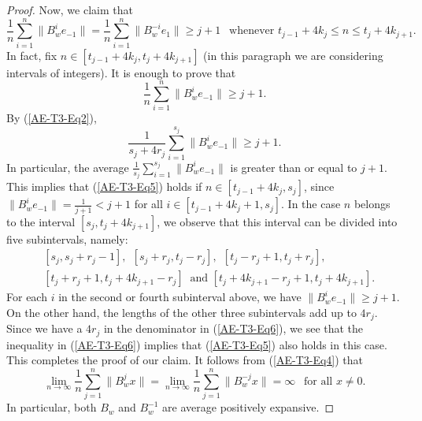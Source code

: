 \documentclass[12pt]{amsart}
\theoremstyle{theorem}
\theoremstyle{definition}
\theoremstyle{remark} \theoremstyle{question} \theoremstyle{example}
\begin{document}
\begin{proof}
Now, we claim that
\begin{equation}\label{AE-T3-Eq4}
\frac{1}{n} \sum_{i=1}^n \|B_w^i e_{-1}\| = \frac{1}{n} \sum_{i=1}^n \|B_w^{-i} e_1\| \geq j+1 \ \ 
  \text{ whenever } t_{j-1} + 4k_j \leq n \leq t_j + 4k_{j+1}.
\end{equation}
In fact, fix $n \in [t_{j-1} + 4k_j, t_j + 4k_{j+1}]$ (in this paragraph we are considering intervals of integers).
It is enough to prove that
\begin{equation}\label{AE-T3-Eq5}
\frac{1}{n} \sum_{i=1}^n \|B_w^i e_{-1}\| \geq j+1.
\end{equation}
By (\ref{AE-T3-Eq2}),
\begin{equation}\label{AE-T3-Eq6}
\frac{1}{s_j + 4 r_j} \sum_{i=1}^{s_j} \|B_w^i e_{-1}\| \geq j+1.
\end{equation}
In particular, the average $\frac{1}{s_j} \sum_{i=1}^{s_j} \|B_w^i e_{-1}\|$ is greater than or equal to $j+1$.
This implies that (\ref{AE-T3-Eq5}) holds if $n \in [t_{j-1} + 4k_j, s_j]$, 
since $\|B_w^i e_{-1}\| = \frac{1}{j+1} < j+1$ for all $i \in [t_{j-1} + 4k_j + 1, s_j]$.
In the case $n$ belongs to the interval $[s_j, t_j + 4k_{j+1}]$, we observe that this interval can be divided into five subintervals, namely:
\begin{align*}
&[s_j, s_j + r_j -1], \ \ [s_j + r_j, t_j - r_j], \ \ [t_j - r_j + 1, t_j + r_j],\\
&[t_j + r_j +1, t_j + 4 k_{j+1} - r_j] \ \text{ and } [t_j + 4 k_{j+1} - r_j + 1, t_j + 4 k_{j+1}].
\end{align*}
For each $i$ in the second or fourth subinterval above, we have $\|B_w^i e_{-1}\| \geq j+1$.
On the other hand, the lengths of the other three subintervals add up to $4 r_j$.
Since we have a $4 r_j$ in the denominator in (\ref{AE-T3-Eq6}), 
we see that the inequality in (\ref{AE-T3-Eq6}) implies that (\ref{AE-T3-Eq5}) also holds in this case.
This completes the proof of our claim. It follows from (\ref{AE-T3-Eq4}) that
\[
\lim_{n \to \infty} \frac{1}{n} \sum_{j=1}^n \|B_w^j x\| = \lim_{n \to \infty} \frac{1}{n} \sum_{j=1}^n \|B_w^{-j} x\| = \infty
  \ \ \text{ for all } x \neq 0.
\]
In particular, both $B_w$ and $B_w^{-1}$ are average positively expansive.


\end{proof}
\end{document}
